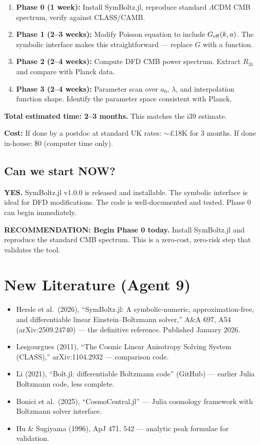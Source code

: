 \documentclass[11pt,a4paper]{article}
\begin{document}
\begin{enumerate}
\item \textbf{Phase 0 (1 week):} Install SymBoltz.jl, reproduce standard $\Lambda$CDM CMB spectrum, verify against CLASS/CAMB.
\item \textbf{Phase 1 (2--3 weeks):} Modify Poisson equation to include $G_{\rm eff}(k, a)$. The symbolic interface makes this straightforward --- replace $G$ with a function.
\item \textbf{Phase 2 (2--4 weeks):} Compute DFD CMB power spectrum. Extract $R_{31}$ and compare with Planck data.
\item \textbf{Phase 3 (2--4 weeks):} Parameter scan over $a_0$, $\lambda$, and interpolation function shape. Identify the parameter space consistent with Planck.
\end{enumerate}

\textbf{Total estimated time: 2--3 months.} This matches the i39 estimate.

\textbf{Cost:} If done by a postdoc at standard UK rates: $\sim$\pounds 18K for 3 months. If done in-house: \$0 (computer time only).

\subsection{Can we start NOW?}

\textbf{YES.} SymBoltz.jl v1.0.0 is released and installable. The symbolic interface is ideal for DFD modifications. The code is well-documented and tested. Phase 0 can begin immediately.

\textbf{RECOMMENDATION: Begin Phase 0 today.} Install SymBoltz.jl and reproduce the standard CMB spectrum. This is a zero-cost, zero-risk step that validates the tool.

\section{New Literature (Agent 9)}

\begin{itemize}
\item Hersle et al.\ (2026), ``SymBoltz.jl: A symbolic-numeric, approximation-free, and differentiable linear Einstein--Boltzmann solver,'' A\&A 697, A54 (arXiv:2509.24740) --- the definitive reference. Published January 2026.
\item Lesgourgues (2011), ``The Cosmic Linear Anisotropy Solving System (CLASS),'' arXiv:1104.2932 --- comparison code.
\item Li (2021), ``Bolt.jl: differentiable Boltzmann code'' (GitHub) --- earlier Julia Boltzmann code, less complete.
\item Bonici et al.\ (2025), ``CosmoCentral.jl'' --- Julia cosmology framework with Boltzmann solver interface.
\item Hu \& Sugiyama (1996), ApJ 471, 542 --- analytic peak formulae for validation.
\end{itemize}
\end{document}
